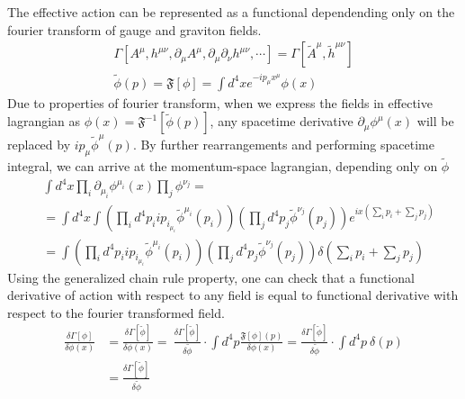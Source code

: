 \documentclass[11pt, a4paper]{article}
\begin{document}

The effective action can be represented as a functional dependending only on the fourier transform of gauge and graviton fields.
\begin{gather}
    \Gamma\left[ A^\mu, h^{\mu\nu}, \partial_\mu A^\mu, \partial_\mu \partial_\nu h^{\mu\nu}, \cdots\right] = \Gamma[ \tilde{A}^\mu, \tilde{h}^{\mu\nu}] \\
    \tilde{\phi}(p) = \mathfrak{F}[\phi] = \int d^4 x e^{-i p_\mu x^\mu} \phi(x)
\end{gather}
Due to properties of fourier transform, when we express the fields in effective lagrangian as $\phi(x) = \mathfrak{F}^{-1}[\tilde{\phi}(p)]$,
any spacetime derivative $\partial_\mu \phi^\mu(x)$ will be replaced by $i p_\mu \tilde{\phi}^\mu(p)$.
By further rearrangements and performing spacetime integral, we can arrive at the momentum-space lagrangian,
depending only on $\tilde{\phi}$
\begin{align}
    & \int d^4 x \prod_i \partial_{\mu_i} \phi^{\mu_i}(x) \prod_j \phi^{\nu_j} = \\
    & = \int d^4 x \int \left( \prod_i d^4 p_i i p_{i_{\mu_{i}}} \tilde{\phi}^{\mu_i}(p_i)\right)\left( \prod_j d^4 p_j \tilde{\phi}^{\nu_j}(p_j)\right) e^{i x \left(\sum_i p_i + \sum_j p_j \right)} \\
    & = \int \left( \prod_i d^4 p_i i p_{i_{\mu_{i}}} \tilde{\phi}^{\mu_i}(p_i)\right)\left( \prod_j d^4 p_j \tilde{\phi}^{\nu_j}(p_j)\right) \delta\left( \sum_i p_i + \sum_j p_j\right)
\end{align} %
Using the generalized chain rule property, one can check that a functional derivative of action with respect to any field is equal to functional derivative with respect to the fourier transformed field.
\begin{align}
    \frac{\delta \Gamma[\phi]}{\delta \phi (x)} & = \frac{\delta \Gamma[ \tilde{\phi}] }{\delta \phi(x)} = \ \frac{\delta \Gamma[ \tilde{\phi} ] }{\delta \tilde{\phi}} \cdot \int d^4 p \frac{\mathfrak{F}[\phi](p)}{\delta \phi(x)} = \frac{\delta \Gamma[ \tilde{\phi} ] }{\delta \tilde{\phi}} \cdot \int d^4 p \ \delta(p) \\
    & = \frac{\delta \Gamma[ \tilde{\phi} ] }{\delta \tilde{\phi}}
\end{align}

\end{document}
